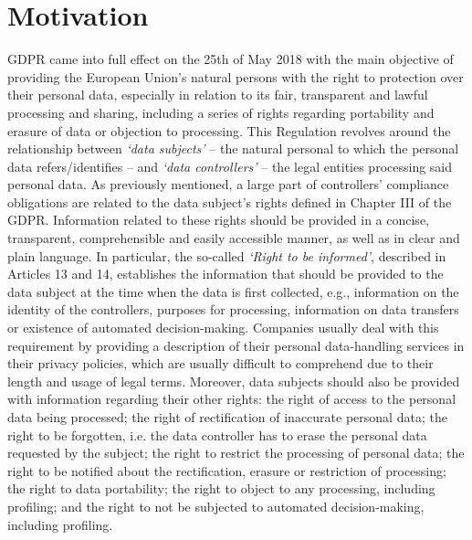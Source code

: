 \section{Motivation}
\label{sec:motivation}

GDPR came into full effect on the 25th of May 2018 with the main objective of providing the European Union’s natural persons with the right to protection over their personal data, especially in relation to its fair, transparent and lawful processing and sharing, including a series of rights regarding portability and erasure of data or objection to processing.
This Regulation revolves around the relationship between \textit{`data subjects'} -- the natural personal to which the personal data refers/identifies -- and \textit{`data controllers'} -- the legal entities processing said personal data.
As previously mentioned, a large part of controllers' compliance obligations are related to the data subject’s rights defined in Chapter III of the GDPR.
Information related to these rights should be provided in a concise, transparent, comprehensible and easily accessible manner, as well as in clear and plain language.
In particular, the so-called \textit{`Right to be informed'}, described in Articles 13 and 14, establishes the information that should be provided to the data subject at the time when the data is first collected, e.g., information on the identity of the controllers, purposes for processing, information on data transfers or existence of automated decision-making.
Companies usually deal with this requirement by providing a description of their personal data-handling services in their privacy policies, which are usually difficult to comprehend due to their length and usage of legal terms.
Moreover, data subjects should also be provided with information regarding their other rights:
the right of access to the personal data being processed; the right of rectification of inaccurate personal data; the right to be forgotten, i.e. the data controller has to erase the personal data requested by the subject; the right to restrict the processing of personal data; the right to be notified about the rectification, erasure or restriction of processing; the right to data portability; the right to object to any processing, including profiling; and the right to not be subjected to automated decision-making, including profiling.

